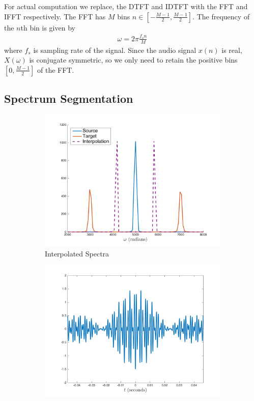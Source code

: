\documentclass[12pt]{article}
\begin{document}
For actual computation we replace, the DTFT and IDTFT with the FFT and IFFT respectively. 
The FFT has $M$ bins $n\in\left[-\frac{M - 1}{2}, \frac{M - 1}{2}\right]$.
The frequency of the $n$th bin is given by
\begin{align}
  \omega = 2\pi\frac{f_s n}{M}
\end{align}
where $f_s$ is sampling rate of the signal.
Since the audio signal $x(n)$ is real, $X(\omega)$ is conjugate symmetric, so we only need to retain the positive bins $\left[0, \frac{M - 1}{2}\right]$ of the FFT.

\subsection{Spectrum Segmentation}

\begin{figure}[!h]
  \begin{center}
  \begin{subfigure}[b]{0.65\textwidth}
    \includegraphics[width=\textwidth]{figures/VerticalIncoherence0}
    \caption{Interpolated Spectra}
    \label{fig:verticalincoherence0}
  \end{subfigure}
  \hspace{1cm}
  \begin{subfigure}[b]{0.65\textwidth}
    \includegraphics[width=\textwidth]{figures/VerticalIncoherence1}

\end{subfigure}
\end{center}
\end{figure}
\end{document}
